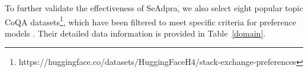 To further validate the effectiveness of SeAdpra, we also select eight popular topic CoQA datasets\footnote{https://huggingface.co/datasets/HuggingFaceH4/stack-exchange-preferences}, which have been filtered to meet specific criteria for preference models \cite{askell2021general}. Their detailed data information is provided in Table~\ref{domain}.


